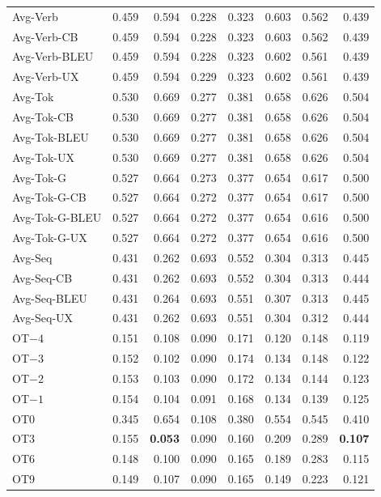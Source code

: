 {\begin{longtable}{@{}lrrrrrrr@{}}
\addlinespace
Avg-Verb & 0.459 & 0.594 & 0.228 & 0.323 & 0.603 & 0.562 & 0.439 \\
Avg-Verb-CB & 0.459 & 0.594 & 0.228 & 0.323 & 0.603 & 0.562 & 0.439 \\
Avg-Verb-BLEU & 0.459 & 0.594 & 0.228 & 0.323 & 0.602 & 0.561 & 0.439 \\
Avg-Verb-UX & 0.459 & 0.594 & 0.229 & 0.323 & 0.602 & 0.561 & 0.439 \\
\addlinespace
Avg-Tok & 0.530 & 0.669 & 0.277 & 0.381 & 0.658 & 0.626 & 0.504 \\
Avg-Tok-CB & 0.530 & 0.669 & 0.277 & 0.381 & 0.658 & 0.626 & 0.504 \\
Avg-Tok-BLEU & 0.530 & 0.669 & 0.277 & 0.381 & 0.658 & 0.626 & 0.504 \\
Avg-Tok-UX & 0.530 & 0.669 & 0.277 & 0.381 & 0.658 & 0.626 & 0.504 \\
Avg-Tok-G & 0.527 & 0.664 & 0.273 & 0.377 & 0.654 & 0.617 & 0.500 \\
Avg-Tok-G-CB & 0.527 & 0.664 & 0.272 & 0.377 & 0.654 & 0.617 & 0.500 \\
Avg-Tok-G-BLEU & 0.527 & 0.664 & 0.272 & 0.377 & 0.654 & 0.616 & 0.500 \\
Avg-Tok-G-UX & 0.527 & 0.664 & 0.272 & 0.377 & 0.654 & 0.616 & 0.500 \\
\addlinespace
Avg-Seq & 0.431 & 0.262 & 0.693 & 0.552 & 0.304 & 0.313 & 0.445 \\
Avg-Seq-CB & 0.431 & 0.262 & 0.693 & 0.552 & 0.304 & 0.313 & 0.444 \\
Avg-Seq-BLEU & 0.431 & 0.264 & 0.693 & 0.551 & 0.307 & 0.313 & 0.445 \\
Avg-Seq-UX & 0.431 & 0.262 & 0.693 & 0.551 & 0.304 & 0.312 & 0.444 \\
\addlinespace
OT$-4$ & 0.151 & 0.108 & 0.090 & 0.171 & 0.120 & 0.148 & 0.119 \\
OT$-3$ & 0.152 & 0.102 & 0.090 & 0.174 & 0.134 & 0.148 & 0.122 \\
OT$-2$ & 0.153 & 0.103 & 0.090 & 0.172 & 0.134 & 0.144 & 0.123 \\
OT$-1$ & 0.154 & 0.104 & 0.091 & 0.168 & 0.134 & 0.139 & 0.125 \\
OT0 & 0.345 & 0.654 & 0.108 & 0.380 & 0.554 & 0.545 & 0.410 \\
OT3 & 0.155 & \textbf{0.053} & 0.090 & 0.160 & 0.209 & 0.289 & \textbf{0.107} \\
OT6 & 0.148 & 0.100 & 0.090 & 0.165 & 0.189 & 0.283 & 0.115 \\
OT9 & 0.149 & 0.107 & 0.090 & 0.165 & 0.149 & 0.223 & 0.121 \\

\end{longtable}}
